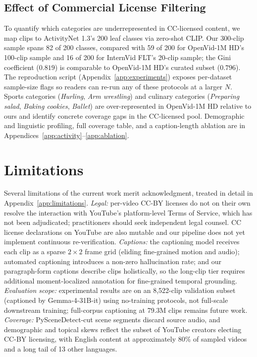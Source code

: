 \documentclass{article}
\begin{document}
\subsection{Effect of Commercial License Filtering}
\label{sec:exp-licensing}

To quantify which categories are underrepresented in CC-licensed content, we map clips to ActivityNet 1.3's 200 leaf classes via zero-shot CLIP. Our 300-clip sample spans 82 of 200 classes, compared with 59 of 200 for OpenVid-1M HD's 100-clip sample and 16 of 200 for InternVid FLT's 20-clip sample; the Gini coefficient ($0.819$) is comparable to OpenVid-1M HD's curated subset ($0.796$). The reproduction script (Appendix~\ref{app:experiments}) exposes per-dataset sample-size flags so readers can re-run any of these protocols at a larger $N$. Sports categories (\textit{Hurling}, \textit{Arm wrestling}) and culinary categories (\textit{Preparing salad}, \textit{Baking cookies}, \textit{Ballet}) are over-represented in OpenVid-1M HD relative to ours and identify concrete coverage gaps in the CC-licensed pool. Demographic and linguistic profiling, full coverage table, and a caption-length ablation are in Appendices~\ref{app:activity}--\ref{app:ablation}.

\section{Limitations}
\label{sec:limitations}

Several limitations of the current work merit acknowledgment, treated in detail in Appendix~\ref{app:limitations}. \textit{Legal:} per-video CC-BY licenses do not on their own resolve the interaction with YouTube's platform-level Terms of Service, which has not been adjudicated; practitioners should seek independent legal counsel. CC license declarations on YouTube are also mutable and our pipeline does not yet implement continuous re-verification. \textit{Captions:} the captioning model receives each clip as a sparse $2 \times 2$ frame grid (eliding fine-grained motion and audio); automated captioning introduces a non-zero hallucination rate; and our paragraph-form captions describe clips holistically, so the long-clip tier requires additional moment-localized annotation for fine-grained temporal grounding. \textit{Evaluation scope:} experimental results are on an 8{,}522-clip validation subset (captioned by Gemma-4-31B-it) using no-training protocols, not full-scale downstream training; full-corpus captioning at 79.3M clips remains future work. \textit{Coverage:} PySceneDetect-cut scene segments discard source audio, and demographic and topical skews reflect the subset of YouTube creators electing CC-BY licensing, with English content at approximately 80\% of sampled videos and a long tail of 13 other languages.
\end{document}
